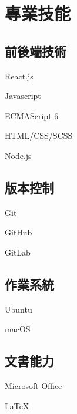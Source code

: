 \documentclass[]{deedy-resume-openfont-ch}
\begin{document}
\begin{minipage}[t]{0.5\textwidth}
\section{專業技能}

\begin{minipage}[t]{0.45\textwidth}
    \subsection{前後端技術}
    \vspace{\topsep}
    \begin{tightemize}
        \item React.js
        \item Javascript
        \item ECMAScript 6
        \item HTML/CSS/SCSS
        \item Node.js
    \end{tightemize}
\end{minipage}
\hfill
\begin{minipage}[t]{0.45\textwidth}
    \subsection{版本控制}
    \vspace{\topsep}
    \begin{tightemize}
        \item Git
        \item GitHub
        \item GitLab
    \end{tightemize}
\end{minipage}

\vspace{\topsep}
\begin{minipage}[t]{0.45\textwidth}
    \subsection{作業系統}
    \vspace{\topsep}
    \begin{tightemize}
        \item Ubuntu
        \item macOS
    \end{tightemize}
\end{minipage}
\hfill
\begin{minipage}[t]{0.45\textwidth}
    \subsection{文書能力}
    \vspace{\topsep}
    \begin{tightemize}
        \item Microsoft Office
        \item LaTeX\
    \end{tightemize}
\end{minipage}


\end{minipage}
\end{document}
